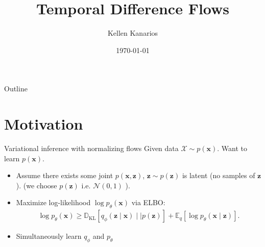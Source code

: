 \documentclass{beamer}
\title{Temporal Difference Flows \citep{farebrotherTemporalDifferenceFlows2025}}
\author{Kellen Kanarios}
\date{\today}
\begin{document}
\begin{frame}
    \titlepage 
\end{frame}


\begin{frame}{Outline}
    \tableofcontents
\end{frame}

\section{Motivation}
\begin{frame}{Variational inference with normalizing flows \citep{rezendeVariationalInferenceNormalizing}} 
    Given data \( \mathcal{X} \sim p(\mathbf{x}) \). Want to learn \( p(\mathbf{x}) \). 
    \begin{itemize}
        \item Assume there exists some joint \( p(\mathbf{x}, \mathbf{z}) \), \( \mathbf{z} \sim p(\mathbf{z}) \) is latent (no samples of \( \mathbf{z} \)). (we choose \( p(\mathbf{z}) \) i.e. \( \mathcal{N}(0, 1) \) \)).
        \item Maximize log-likelihood \( \log p_{\theta}(\mathbf{x}) \) via ELBO:
            \begin{align*}
                \log p_{\theta}(\mathbf{x}) \geq \mathbb{D}_{\mathrm{KL}}[q_{\phi}(\mathbf{z} \mid \mathbf{x}) \mid \mid p(\mathbf{z})] + \mathbb{E}_{q}[\log p_{\theta}(\mathbf{x} \mid \mathbf{z})] \tag*{(ELBO)}
            .\end{align*}
        \item Simultaneously learn \( q_{\phi} \) and \( p_{\theta} \)
    \end{itemize}
\end{frame}
\end{document}
